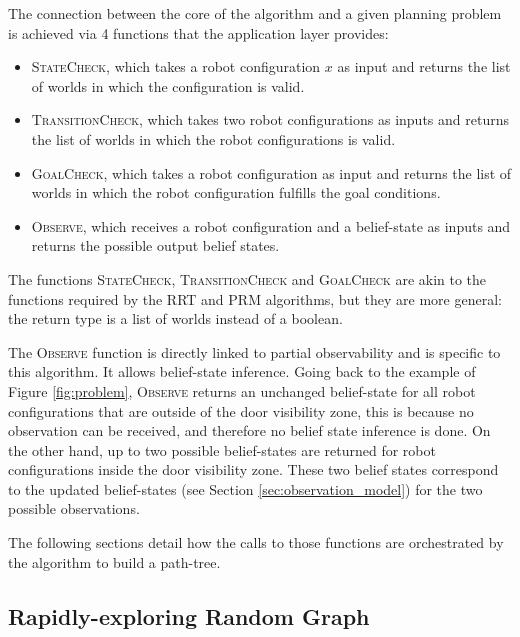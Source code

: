 \documentclass[letterpaper, 10 pt, conference]{ieeeconf}  %
\begin{document}
The connection between the core of the algorithm and a given planning problem is achieved via 4 functions that the application layer provides: 
\begin{itemize}
\item \textsc{StateCheck}, which takes a robot configuration $x$ as input and returns the list of worlds in which the configuration is valid.
\item \textsc{TransitionCheck}, which takes two robot configurations as inputs and returns the list of worlds in which the robot configurations is valid.
\item \textsc{GoalCheck}, which takes a robot configuration as input and returns the list of worlds in which the robot configuration fulfills the goal conditions.
\item \textsc{Observe}, which receives a robot configuration and a belief-state as inputs and returns the possible output belief states. %
\end{itemize}

The functions \textsc{StateCheck}, \textsc{TransitionCheck} and \textsc{GoalCheck} are akin to the functions required by the RRT and PRM algorithms, but they are more general: the return type is a list of worlds instead of a boolean.

The \textsc{Observe} function is directly linked to partial observability and is specific to this algorithm. It allows belief-state inference. Going back to the example of Figure \ref{fig:problem}, \textsc{Observe} returns an unchanged belief-state for all robot configurations that are outside of the door visibility zone, this is because no observation can be received, and therefore no belief state inference is done. On the other hand, up to two possible belief-states are returned for robot configurations inside the door visibility zone. These two belief states correspond to the updated belief-states (see Section \ref{sec:observation_model}) for the two possible observations.

The following sections detail how the calls to those functions are orchestrated by the algorithm to build a path-tree.

\subsection{Rapidly-exploring Random Graph}
\label{section:rapidly-exploring-random-graph}
\end{document}
